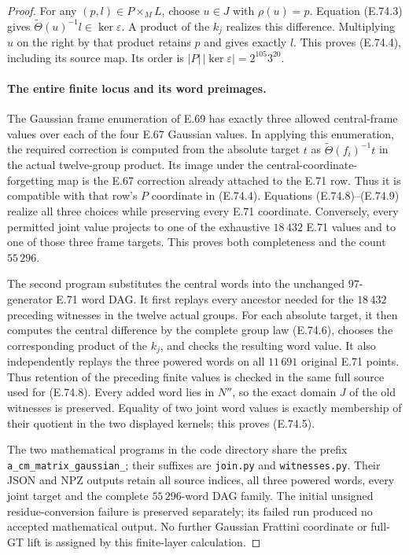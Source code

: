\begin{proof}
For any $(p,l)\in P\times_M L$, choose $u\in J$ with
$\rho(u)=p$. Equation (E.74.3) gives
$\widetilde\Theta(u)^{-1}l\in\ker\varepsilon$.
A product of the $k_j$ realizes this difference. Multiplying
$u$ on the right by that product retains $p$ and gives exactly
$l$. This proves (E.74.4), including its source map. Its order
is $|P|\,|\ker\varepsilon|=2^{105}3^{20}$.

\paragraph{The entire finite locus and its word preimages.}
The Gaussian frame enumeration of E.69 has exactly three
allowed central-frame values over each of the four E.67
Gaussian values. In applying this enumeration, the required
correction is computed from the absolute target $t$ as
$\widetilde\Theta(f_i)^{-1}t$ in the actual twelve-group
product. Its image under the central-coordinate-forgetting
map is the E.67 correction already attached to the E.71 row.
Thus it is compatible with that row's $P$ coordinate in
(E.74.4). Equations (E.74.8)--(E.74.9) realize all three
choices while preserving every E.71 coordinate. Conversely,
every permitted joint value projects to one of the exhaustive
$18\,432$ E.71 values and to one of those three frame targets.
This proves both completeness and the count $55\,296$.

The second program substitutes the central words into the
unchanged $97$-generator E.71 word DAG. It first replays every
ancestor needed for the $18\,432$ preceding witnesses in the
twelve actual groups. For each absolute target, it then
computes the central difference by the complete group law
(E.74.6), chooses the corresponding product of the $k_j$,
and checks the resulting word value. It also independently
replays the three powered words on all $11\,691$ original
E.71 points. Thus retention of the preceding finite values
is checked in the same full source used for (E.74.8).
Every added word lies in $N''$, so the exact domain $J$ of
the old witnesses is preserved. Equality of two joint word
values is exactly membership of their quotient in the two
displayed kernels; this proves (E.74.5).

The two mathematical programs in the code directory share
the prefix \texttt{a\_cm\_}\allowbreak\texttt{matrix\_gaussian\_}; their suffixes
are \texttt{join.py} and \texttt{witnesses.py}.
Their JSON and NPZ outputs retain all source
indices, all three powered words, every joint target and
the complete $55\,296$-word DAG family. The initial unsigned
residue-conversion failure is preserved separately; its
failed run produced no accepted mathematical output.
No further Gaussian Frattini coordinate or full-GT lift is
assigned by this finite-layer calculation.
\end{proof}
